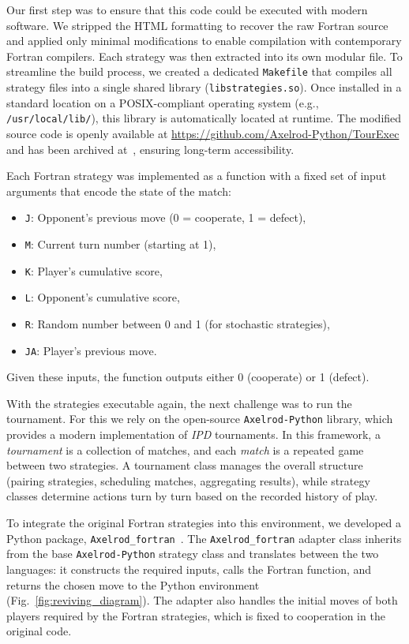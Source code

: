 \documentclass{article}
\newcommand{\IPD}{\emph{IPD}}
\newcommand{\AXL}{\texttt{Axelrod-Python}}
\newcommand{\AXLFortran}{\texttt{Axelrod\_fortran}}
\begin{document}
Our first step was to ensure that this code could be executed with modern
software. We stripped the HTML formatting to recover the raw Fortran source and
applied only minimal modifications to enable compilation with contemporary
Fortran compilers. Each strategy was then extracted into its own modular file.
To streamline the build process, we created a dedicated \texttt{Makefile} that
compiles all strategy files into a single shared library
(\texttt{libstrategies.so}). Once installed in a standard location on a
POSIX-compliant operating system (e.g., \texttt{/usr/local/lib/}), this library
is automatically located at runtime. The modified source code is openly
available at \url{https://github.com/Axelrod-Python/TourExec} and has been
archived at~\cite{TourExec}, ensuring long-term accessibility.

Each Fortran strategy was implemented as a function with a fixed set of input
arguments that encode the state of the match:

\begin{itemize}
    \item \texttt{J}: Opponent's previous move (0 = cooperate, 1 = defect),
    \item \texttt{M}: Current turn number (starting at 1),
    \item \texttt{K}: Player's cumulative score,
    \item \texttt{L}: Opponent's cumulative score,
    \item \texttt{R}: Random number between 0 and 1 (for stochastic strategies),
    \item \texttt{JA}: Player's previous move.
\end{itemize}

Given these inputs, the function outputs either 0 (cooperate) or 1 (defect).

With the strategies executable again, the next challenge was to run the
tournament. For this we rely on the open-source \AXL{} library, which provides a
modern implementation of \IPD{} tournaments. In this framework, a
\emph{tournament} is a collection of matches, and each \emph{match} is a
repeated game between two strategies. A tournament class manages the overall
structure (pairing strategies, scheduling matches, aggregating results), while
strategy classes determine actions turn by turn based on the recorded history of
play.

To integrate the original Fortran strategies into this environment, we developed
a Python package, \AXLFortran~\cite{Axelrod_fortran}. The \AXLFortran{} adapter
class inherits from the base \AXL{} strategy class and translates between the two
languages: it constructs the required inputs, calls the Fortran function, and
returns the chosen move to the Python environment
(Fig.~\ref{fig:reviving_diagram}). The adapter also handles the initial moves
of both players
required by the Fortran strategies, which is fixed to cooperation in the original
code.
\end{document}
